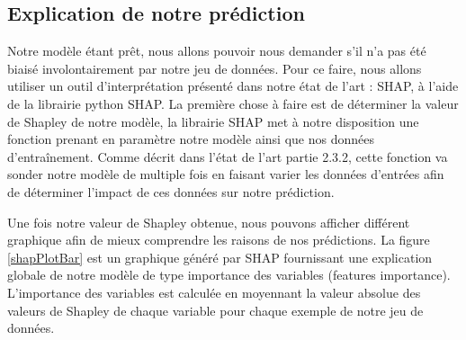 \subsection{Explication de notre prédiction}
Notre modèle étant prêt, nous allons pouvoir nous demander s'il n'a pas été biaisé involontairement par notre jeu de données. Pour ce faire, nous allons utiliser un outil d'interprétation présenté dans notre état de l'art : SHAP, à l'aide de la librairie python SHAP. La première chose à faire est de déterminer la valeur de Shapley de notre modèle, la librairie SHAP met à notre disposition une fonction prenant en paramètre notre modèle ainsi que nos données d'entraînement. Comme décrit dans l'état de l'art partie 2.3.2, cette fonction va sonder notre modèle de multiple fois en faisant varier les données d'entrées afin de déterminer l'impact de ces données sur notre prédiction.\par
Une fois notre valeur de Shapley obtenue, nous pouvons afficher différent graphique afin de mieux comprendre les raisons de nos prédictions. La figure \ref{shapPlotBar} est un graphique généré par SHAP fournissant une explication globale de notre modèle de type importance des variables (features importance). L’importance des variables est calculée en moyennant la valeur absolue des valeurs de Shapley de chaque variable pour chaque exemple de notre jeu de données.

